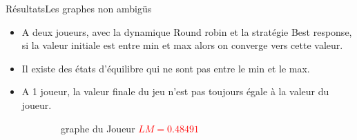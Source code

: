 \documentclass{beamer}
\begin{document}
  \begin{frame}{Résultats}{Les graphes non ambigüs}
    \begin{itemize}
      \item<1-> A deux joueurs, avec la dynamique Round robin et la stratégie Best response, si la valeur initiale est entre min et max alors on converge vers cette valeur.
      \item<2-> Il existe des états d'équilibre qui ne sont pas entre le min et le max.
      \item<3-> A 1 joueur, la valeur finale du jeu n'est pas toujours égale à la valeur du joueur.
    \end{itemize}

    \begin{overprint}
        \begin{figure}
          \centering
          \begin{subfigure}{.45\linewidth}
            \caption {graphe du Joueur \textcolor{red}{$LM = 0.48491$}}
  			\end{subfigure}
        \begin{subfigure}{.45\linewidth}
\end{subfigure}
\end{figure}
\end{overprint}
\end{frame}
\end{document}
